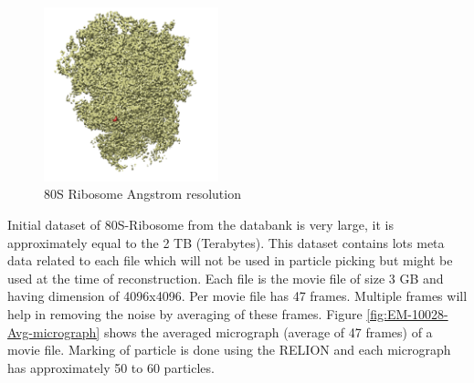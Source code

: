 \documentclass{report}
\begin{document}
\begin{figure}[h]
\includegraphics[width=0.45\textwidth]{EMPIAR-10028}
\centering
\captionsetup{justification=centering}
\caption{80S Ribosome\protect{} Angstrom resolution}
\label{fig:EMPIAR-10028-3d-struct}
\end{figure}

Initial dataset of 80S-Ribosome from the databank is very large, it is approximately equal to the 2 TB (Terabytes). This dataset contains lots meta data related to each file which will not be used in particle picking but might be used at the time of reconstruction. Each file is the movie file of size 3 GB and having dimension of 4096x4096. Per movie file has 47 frames. Multiple frames will help in removing the noise by averaging of these frames. Figure \ref{fig:EM-10028-Avg-micrograph} shows the averaged micrograph (average of 47 frames) of a movie file. Marking of particle is done using the RELION and each micrograph has approximately 50 to 60 particles.
\end{document}
